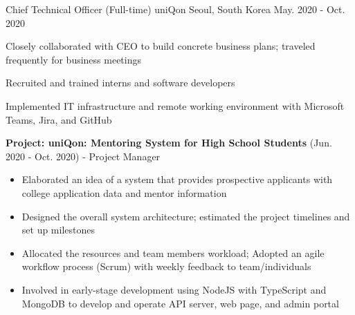 \begin{cventries}
  \cventry
  {Chief Technical Officer (Full-time)} %
  {uniQon} %
  {Seoul, South Korea} %
  {May. 2020 - Oct. 2020} %
  {
    \begin{cvitems} %
      \item {Closely collaborated with CEO to build concrete business plans; traveled frequently for business meetings}
      \item {Recruited and trained interns and software developers}
      \item {Implemented IT infrastructure and remote working environment with Microsoft Teams, Jira, and GitHub}
      \item {\textbf{Project: uniQon: Mentoring System for High School Students} (Jun. 2020 - Oct. 2020) - Project Manager}
      \begin{itemize}[leftmargin=0pt, label={}]
        \item {Elaborated an idea of a system that provides prospective applicants with college application data and mentor information}
        \item {Designed the overall system architecture; estimated the project timelines and set up milestones}
        \item {Allocated the resources and team members workload; Adopted an agile workflow process (Scrum) with weekly feedback to team/individuals}
        \item {Involved in early-stage development using NodeJS with TypeScript and MongoDB to develop and operate API server, web page, and admin portal}
      \end{itemize}
    \end{cvitems}
  }


\end{cventries}
